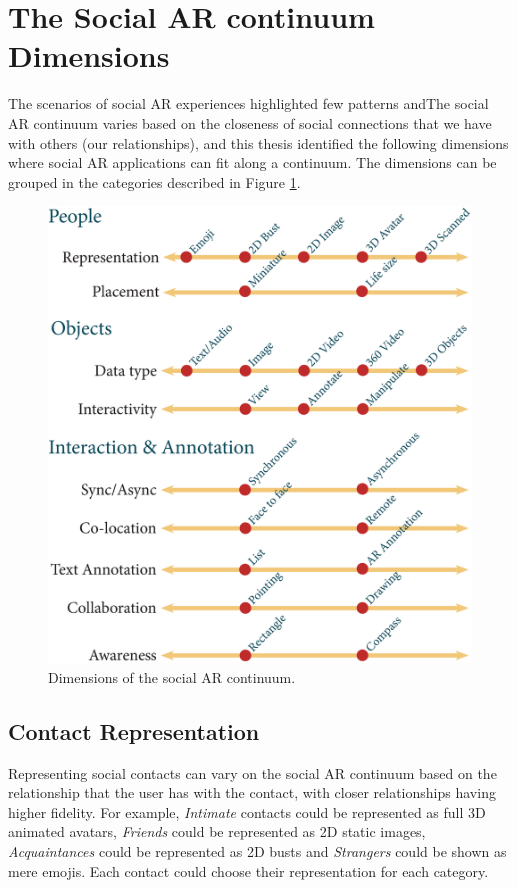 \section{The Social AR continuum Dimensions}

The scenarios of social AR experiences highlighted few patterns andThe social AR continuum varies based on the closeness of social connections that we have with others (our relationships), and this thesis identified the following dimensions where social AR applications can fit along a continuum. The dimensions can be grouped in the categories described in Figure \ref{fig:continuum:dimensions}.

\begin{figure}[h]
    \centering
    \includegraphics[width=.8\linewidth]{images/continuum4_1.eps}
    \caption{Dimensions of the social AR continuum.}
    \label{fig:continuum:dimensions}
\end{figure}

\subsection{Contact Representation}

Representing social contacts can vary on the social AR continuum based on the relationship that the user has with the contact, with closer relationships having higher fidelity. For example, \textit{Intimate} contacts could be represented as full 3D animated avatars, \textit{Friends} could be represented as 2D static images, \textit{Acquaintances} could be represented as 2D busts and \textit{Strangers} could be shown as mere emojis. Each contact could choose their representation for each category.

